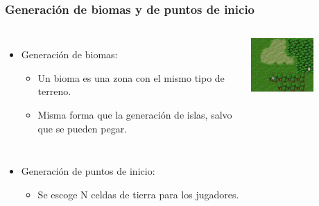 \begin{frame}
\frametitle{Generación de biomas y de puntos de inicio}

\begin{columns}
	
	\begin{itemize}
		\item<1-> \textcolor{UDCpink}{Generación de biomas}:
		
		\vspace{0.5em}
		
		\begin{itemize}
			\item<1-> Un bioma es una zona con el \textcolor{UDCpink}{mismo tipo de terreno}.
			
			\vspace{0.5em}
			
			\item<2-> Misma forma que la generación de islas, salvo que se pueden \textcolor{UDCpink}{pegar}.
		\end{itemize}
	\end{itemize}
	
	\centering
	\includegraphics[width=0.6\textwidth]{images/biomas.png}
	
\end{columns}

\vspace{1em}

\begin{itemize}
	\item<3-> \textcolor{UDCpink}{Generación de puntos de inicio}:
	
	\vspace{0.5em}
	
	\begin{itemize}
		\item<3-> Se escoge N celdas de tierra para los jugadores.
		

\end{itemize}
\end{itemize}
\end{frame}
